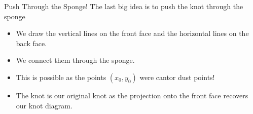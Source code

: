 \begin{frame}[c]{Push Through the Sponge!}
The last big idea is to push the knot through the sponge
\begin{itemize}
    \item We draw the vertical lines on the front face and the horizontal lines on the back face.
    \item We connect them through the sponge.
    \item This is possible as the points $(x_0, y_0)$ were cantor dust points!
    \item The knot is our original knot as the projection onto the front face recovers our knot diagram.
\end{itemize}
\end{frame}